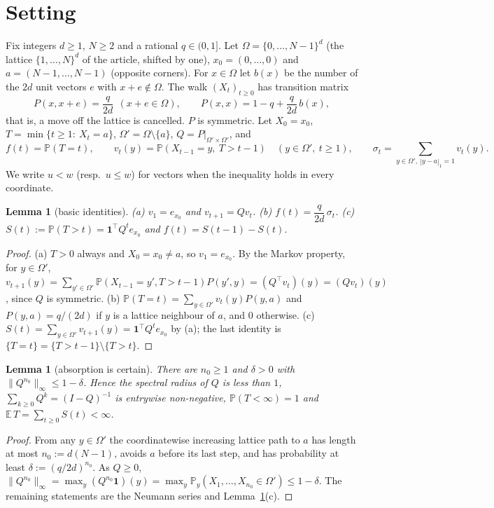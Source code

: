 \documentclass[11pt,a4paper]{article}
\newtheorem{lemma}[theorem]{Lemma}
\theoremstyle{definition}
\theoremstyle{remark}
\begin{document}
\section{Setting}\label{sec:setting}

Fix integers $d\ge1$, $N\ge2$ and a rational $q\in(0,1]$. Let $\Omega=\{0,\dots,N-1\}^d$ (the lattice $\{1,\dots,N\}^d$ of the article, shifted by one), $x_0=(0,\dots,0)$ and $a=(N-1,\dots,N-1)$ (opposite corners). For $x\in\Omega$ let $b(x)$ be the number of the $2d$ unit vectors $e$ with $x+e\notin\Omega$. The walk $(X_t)_{t\ge0}$ has transition matrix
\[
P(x,x+e)=\frac{q}{2d}\ \ (x+e\in\Omega),\qquad P(x,x)=1-q+\frac{q}{2d}\,b(x),
\]
that is, a move off the lattice is cancelled. $P$ is symmetric. Let $X_0=x_0$, $T=\min\{t\ge1:\ X_t=a\}$, $\Omega'=\Omega\setminus\{a\}$, $Q=P|_{\Omega'\times\Omega'}$, and
\[
f(t)=\mathbb P(T=t),\qquad v_t(y)=\mathbb P(X_{t-1}=y,\ T>t-1)\quad(y\in\Omega',\ t\ge1),\qquad \sigma_t=\sum_{y\in\Omega',\ |y-a|_1=1}v_t(y).
\]
We write $u<w$ (resp.\ $u\le w$) for vectors when the inequality holds in every coordinate.

\begin{lemma}[basic identities]\label{lem:basic}
\textup{(a)} $v_1=e_{x_0}$ and $v_{t+1}=Qv_t$. \textup{(b)} $f(t)=\dfrac{q}{2d}\,\sigma_t$. \textup{(c)} $S(t):=\mathbb P(T>t)=\mathbf 1^{\!\top}Q^te_{x_0}$ and $f(t)=S(t-1)-S(t)$.
\end{lemma}
\begin{proof}
(a) $T>0$ always and $X_0=x_0\neq a$, so $v_1=e_{x_0}$. By the Markov property, for $y\in\Omega'$,
$v_{t+1}(y)=\sum_{y'\in\Omega'}\mathbb P(X_{t-1}=y',T>t-1)P(y',y)=(Q^{\!\top}v_t)(y)=(Qv_t)(y)$, since $Q$ is symmetric.
(b) $\mathbb P(T=t)=\sum_{y\in\Omega'}v_t(y)P(y,a)$ and $P(y,a)=q/(2d)$ if $y$ is a lattice neighbour of $a$, and $0$ otherwise.
(c) $S(t)=\sum_{y\in\Omega'}v_{t+1}(y)=\mathbf 1^{\!\top}Q^te_{x_0}$ by (a); the last identity is $\{T=t\}=\{T>t-1\}\setminus\{T>t\}$.
\end{proof}

\begin{lemma}[absorption is certain]\label{lem:rho}
There are $n_0\ge1$ and $\delta>0$ with $\|Q^{n_0}\|_\infty\le1-\delta$. Hence the spectral radius of $Q$ is less than $1$, $\sum_{k\ge0}Q^k=(I-Q)^{-1}$ is entrywise non-negative, $\mathbb P(T<\infty)=1$ and $\mathbb E\,T=\sum_{t\ge0}S(t)<\infty$.
\end{lemma}
\begin{proof}
From any $y\in\Omega'$ the coordinatewise increasing lattice path to $a$ has length at most $n_0:=d(N-1)$, avoids $a$ before its last step, and has probability at least $\delta:=(q/2d)^{n_0}$. As $Q\ge0$, $\|Q^{n_0}\|_\infty=\max_y(Q^{n_0}\mathbf 1)(y)=\max_y\mathbb P_y(X_1,\dots,X_{n_0}\in\Omega')\le1-\delta$. The remaining statements are the Neumann series and Lemma~\ref{lem:basic}(c).
\end{proof}
\end{document}
